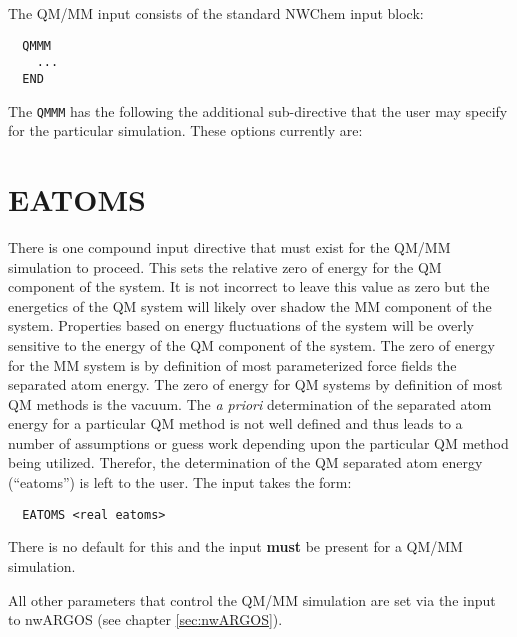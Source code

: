 The QM/MM input consists of the standard NWChem input block:
\begin{verbatim}
  QMMM
    ...
  END
\end{verbatim}

The \verb+QMMM+ has the following the additional sub-directive that the user
may specify for the particular simulation.  These options currently are:

\section{EATOMS}
There is one compound input directive that must exist for the QM/MM
simulation to proceed.  This sets the relative zero of energy for the
QM component of the system.  It is not incorrect to leave this value as
zero but the energetics of the QM system will likely over shadow the
MM component of the system.  Properties based on energy fluctuations
of the system will be overly sensitive to the energy of the QM
component of the system.  The zero of energy for the MM system is by
definition of most parameterized force fields the separated atom
energy.  The zero of energy for QM systems by definition of most QM
methods is the vacuum.  The {\it a priori} determination of the
separated atom energy for a particular QM method is not well defined
and thus leads to a number of assumptions or guess work depending upon
the particular QM method being utilized.  Therefor, the determination
of the QM separated atom energy (``eatoms'') is left to the user.  The
input takes the form:

\begin{verbatim}
  EATOMS <real eatoms>
\end{verbatim}

There is no default for this and the input {\bf must} be present for a
QM/MM simulation.  

All other parameters that control the QM/MM simulation are set via the
input to nwARGOS (see chapter \ref{sec:nwARGOS}).

